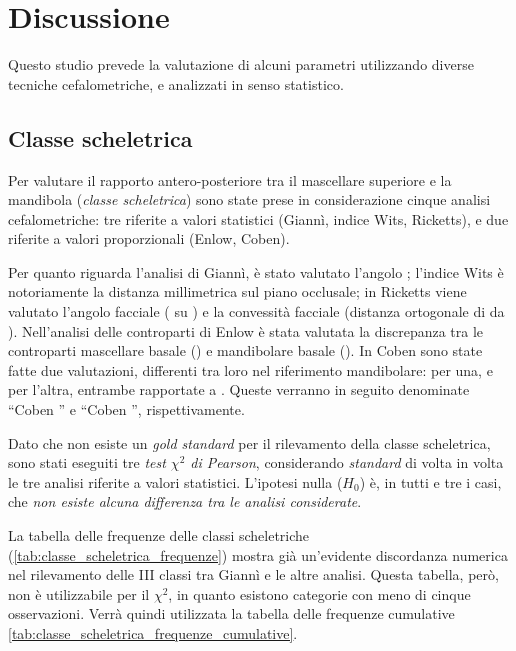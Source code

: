 \chapter{Discussione}
Questo studio prevede la valutazione di alcuni parametri utilizzando diverse tecniche cefalometriche, e analizzati in senso statistico.

\section{Classe scheletrica}
Per valutare il rapporto antero-posteriore tra il mascellare superiore e la mandibola (\emph{classe scheletrica}) sono state prese in considerazione cinque analisi cefalometriche: tre riferite a valori statistici (Giannì, indice Wits, Ricketts), e due riferite a valori proporzionali (Enlow, Coben).

Per quanto riguarda l'analisi di Giannì, è stato valutato l'angolo ; l'indice Wits è notoriamente la distanza millimetrica  sul piano occlusale; in Ricketts viene valutato l'angolo facciale ( su ) e la convessità facciale (distanza ortogonale di  da ). Nell'analisi delle controparti di Enlow è stata valutata la discrepanza tra le controparti mascellare basale () e mandibolare basale (). In Coben sono state fatte due valutazioni, differenti tra loro nel riferimento mandibolare:  per una, e  per l'altra, entrambe rapportate a . Queste verranno in seguito denominate ``Coben '' e ``Coben '', rispettivamente.

Dato che non esiste un \emph{gold standard} per il rilevamento della classe scheletrica, sono stati eseguiti tre \emph{test $\chi^2$ di Pearson}, considerando \emph{standard} di volta in volta le tre analisi riferite a valori statistici. L'ipotesi nulla ($H_0$) è, in tutti e tre i casi, che \emph{non esiste alcuna differenza tra le analisi considerate}.

La tabella delle frequenze delle classi scheletriche (\ref{tab:classe_scheletrica_frequenze}) mostra già un'evidente discordanza numerica nel rilevamento delle III classi tra Giannì e le altre analisi. Questa tabella, però, non è utilizzabile per il $\chi^2$, in quanto esistono categorie con meno di cinque osservazioni. Verrà quindi utilizzata la tabella delle frequenze cumulative \ref{tab:classe_scheletrica_frequenze_cumulative}.

